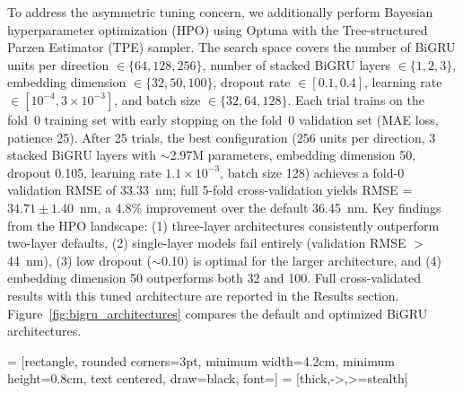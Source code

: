 To address the asymmetric tuning concern, we additionally perform Bayesian hyperparameter optimization (HPO) using Optuna\cite{akiba2019optuna} with the Tree-structured Parzen Estimator (TPE) sampler.
The search space covers the number of BiGRU units per direction $\in \{64, 128, 256\}$, number of stacked BiGRU layers $\in \{1, 2, 3\}$, embedding dimension $\in \{32, 50, 100\}$, dropout rate $\in [0.1, 0.4]$, learning rate $\in [10^{-4}, 3 \times 10^{-3}]$, and batch size $\in \{32, 64, 128\}$.
Each trial trains on the fold~0 training set with early stopping on the fold~0 validation set (MAE loss, patience 25).
After 25 trials, the best configuration (256 units per direction, 3 stacked BiGRU layers with $\sim$2.97M parameters, embedding dimension 50, dropout 0.105, learning rate $1.1 \times 10^{-3}$, batch size 128) achieves a fold-0 validation RMSE of 33.33~nm; full 5-fold cross-validation yields RMSE = $34.71 \pm 1.40$~nm, a 4.8\% improvement over the default 36.45~nm.
Key findings from the HPO landscape: (1) three-layer architectures consistently outperform two-layer defaults, (2) single-layer models fail entirely (validation RMSE $>$44~nm), (3) low dropout ($\sim$0.10) is optimal for the larger architecture, and (4) embedding dimension 50 outperforms both 32 and 100.
Full cross-validated results with this tuned architecture are reported in the Results section.
Figure~\ref{fig:bigru_architectures} compares the default and optimized BiGRU architectures.

 = [rectangle, rounded corners=3pt, minimum width=4.2cm, minimum height=0.8cm, text centered, draw=black, font=\small]
 = [thick,->,>=stealth]

